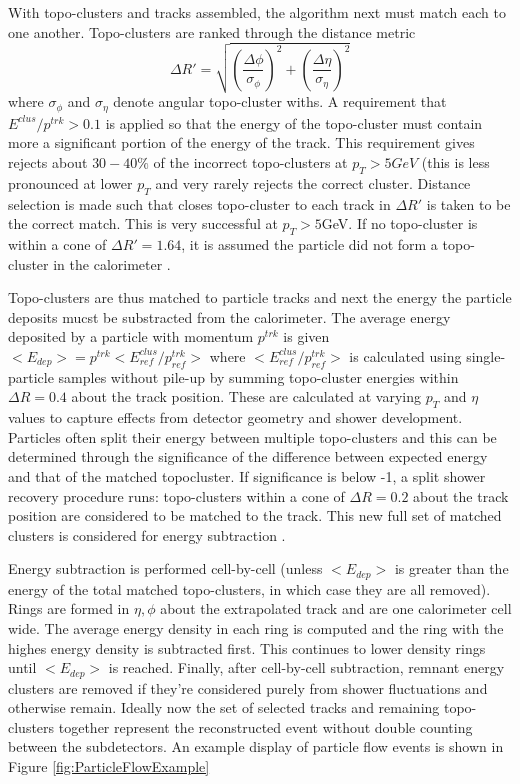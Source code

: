 With topo-clusters and tracks assembled, the algorithm next must match each to one another. Topo-clusters are ranked through the distance metric 
\begin{equation}
\Delta R' = \sqrt{(\frac{\Delta \phi}{\sigma_\phi})^2+(\frac{\Delta \eta}{\sigma_\eta})^2}
\end{equation}
where $\sigma_\phi$ and $\sigma_\eta$ denote angular topo-cluster withs. A requirement that $E^{clus}/p^{trk}>0.1$ is applied so that the energy of the topo-cluster must contain more a significant portion of the energy of the track. This requirement gives rejects about $30-40\%$ of the incorrect topo-clusters at $p_T>5 GeV $ (this is less pronounced at lower $p_T$ and very rarely rejects the correct cluster. Distance selection is made such that closes topo-cluster to each track in $\Delta R'$ is taken to be the correct match. This is very successful at $p_T>5$GeV. If no topo-cluster is within a cone of $\Delta R'= 1.64$, it is assumed the particle did not form a topo-cluster in the calorimeter \cite{ParticleFlow}. 

Topo-clusters are thus matched to particle tracks and next the energy the particle deposits mucst be substracted from the calorimeter. The average energy deposited by a particle with momentum $p^{trk}$ is given $<E_{dep}>=p^{trk}<E_{ref}^{clus}/p_{ref}^{trk}>$ where $<E_{ref}^{clus}/p_{ref}^{trk}>$ is calculated using single-particle samples without pile-up by summing topo-cluster energies within $\Delta R = 0.4$ about the track position. These are calculated at varying $p_T$ and $\eta$ values to capture effects from detector geometry and shower development. Particles often split their energy between multiple topo-clusters and this can be determined through the significance of the difference between expected energy and that of the matched topocluster. If significance is below -1, a split shower recovery procedure runs: topo-clusters within a cone of $\Delta R =0.2$ about the track position are considered to be matched to the track. This new full set of matched clusters is considered for energy subtraction \cite{ParticleFlow}. 

Energy subtraction is performed cell-by-cell (unless $<E_{dep}>$ is greater than the energy of the total matched topo-clusters, in which case they are all removed). Rings are formed in $\eta,\phi$ about the extrapolated track and are one calorimeter cell wide. The average energy density in each ring is computed and the ring with the highes energy density is subtracted first. This continues to lower density rings until $<E_{dep}>$ is reached. Finally, after cell-by-cell subtraction, remnant energy clusters are removed if they're considered purely from shower fluctuations and otherwise remain. Ideally now the set of selected tracks and remaining topo-clusters together represent the reconstructed event without double counting between the subdetectors. An example display of particle flow events is shown in Figure \ref{fig:ParticleFlowExample}

